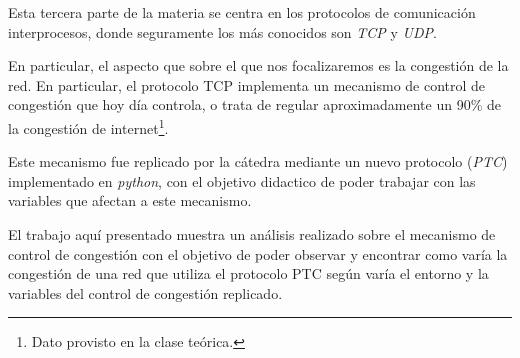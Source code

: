 Esta tercera parte de la materia se centra en los protocolos de comunicaci\'on
interprocesos, donde seguramente los m\'as conocidos son \textit{TCP}\cite{rfc675}
y \textit{UDP}\cite{rfc768}.

\par En particular, el aspecto que sobre el que nos focalizaremos es la
congesti\'on de la red. En particular, el protocolo TCP implementa un mecanismo
de control de congesti\'on\cite{rfc5681} que hoy d\'ia controla, o trata de regular
aproximadamente un 90\% de la congesti\'on de internet\footnote{Dato provisto
en la clase te\'orica.}.

\par Este mecanismo fue replicado por la c\'atedra mediante un nuevo protocolo
(\textit{PTC\cite{ptc}}) implementado en \textit{python}\cite{python}, con el
objetivo didactico de poder trabajar con las variables que afectan a este
mecanismo.

\par El trabajo aqu\'i presentado muestra un an\'alisis realizado sobre el
mecanismo de control de congesti\'on con el objetivo de poder observar y
encontrar como var\'ia la congesti\'on de una red que utiliza el protocolo
PTC seg\'un var\'ia el entorno y la variables del control de congesti\'on
replicado.
